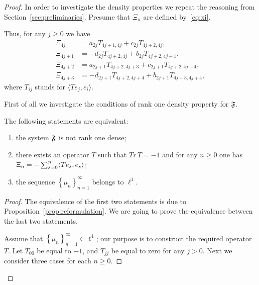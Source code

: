     \begin{proof}
      In order to investigate the density properties we repeat the reasoning from Section~\ref{sec:preliminaries}.
      Presume that $\Xi_n$ are defined by~\eqref{eq:xi}.

      Thus, for any $j \geq 0$ we have
      \begin{equation}
        \label{eq:xi5}
        \begin{aligned}
          \Xi_{4j} &= a_{2j} T_{4j+1, 4j} + c_{2j} T_{4j+2, 4j},\\
          \Xi_{4j + 1} &= -d_{2j} T_{4j+2, 4j} + b_{2j} T_{4j+2, 4j+1},\\
          \Xi_{4j + 2} &= a_{2j+1} T_{4j+2, 4j+3} + c_{2j+1} T_{4j+2, 4j+4},\\
          \Xi_{4j + 3} &= -d_{2j+1} T_{4j+2, 4j+4} + b_{2j+1} T_{4j+3, 4j+4},
        \end{aligned}
      \end{equation}
        where $T_{ij}$ stands for $\langle Te_j, e_i \rangle$.

      First of all we investigate the conditions of rank one density property for $\mathfrak{F}$.
      \begin{prop}
        \label{prop:inf-dim}
        The following statements are equivalent:
        \begin{enumerate}
          \item the system $\mathfrak{F}$ is not rank one dense;
          \item there exists an operator $T$ such that $Tr\,T = -1$ and for any $n \geq 0$ one has $\Xi_n = -\sum_{s=0}^n \langle Te_s, e_s \rangle$;
          \item the sequence $\left\{\mu_n\right\}_{n=1}^\infty$ belongs to $\ell^1$.
        \end{enumerate}
      \end{prop}
      \begin{proof}
        The equivalence of the first two statements is due to Proposition~\ref{prop:reformulation}.
        We are going to prove the equivalence between the last two statements.

        Assume that $\left\{\mu_n\right\}_{n=1}^\infty \in \ell^1$; our purpose is to construct the required operator $T$.
        Let $T_{00}$ be equal to $-1$, and $T_{jj}$ be equal to zero for any $j > 0$.
        Next we consider three cases for each $n \geq 0$.


\end{proof}
\end{proof}

